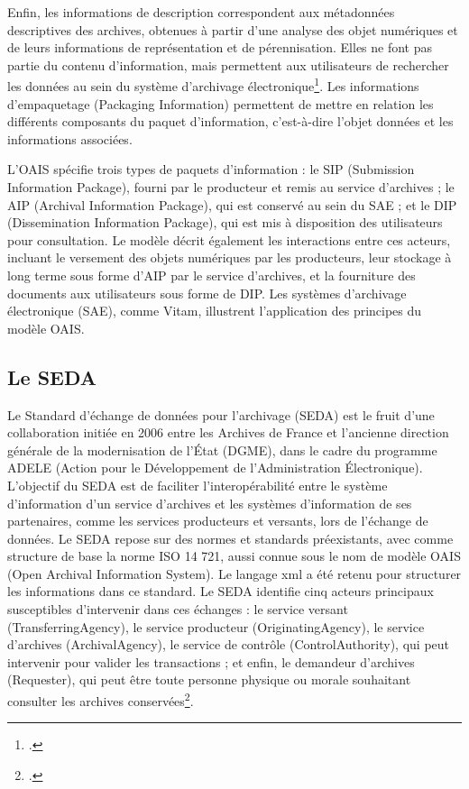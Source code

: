 Enfin, les informations de description correspondent aux métadonnées descriptives des archives, obtenues à partir d'une analyse des objet numériques et de leurs informations de représentation et de pérennisation. Elles ne font pas partie du contenu d'information, mais permettent aux utilisateurs de rechercher les données au sein du système d'archivage électronique\footcite[p.172]{rietschDematerialisationArchivageElectronique2006}. Les informations d’empaquetage  (Packaging  Information) permettent de mettre  en  relation  les  différents composants du paquet d'information, c'est-à-dire l'objet données et les informations associées.

L’OAIS spécifie trois types de paquets d'information : le SIP (Submission Information Package), fourni par le producteur et remis au service d'archives ; le AIP (Archival Information Package), qui est conservé au sein du SAE ; et le DIP (Dissemination Information Package), qui est mis à disposition des utilisateurs pour consultation. Le modèle décrit également les interactions entre ces acteurs, incluant le versement des objets numériques par les producteurs, leur stockage à long terme sous forme d’AIP par le service d'archives, et la fourniture des documents aux utilisateurs sous forme de DIP. Les systèmes d'archivage électronique (SAE), comme Vitam, illustrent l'application des principes du modèle OAIS. 

\subsection*{Le SEDA}
Le Standard d'échange de données pour l'archivage (SEDA) est le fruit d'une collaboration initiée en 2006 entre les Archives de France et l'ancienne direction générale de la modernisation de l'État (DGME), dans le cadre du programme ADELE (Action pour le Développement de l'Administration Électronique). L'objectif du SEDA est de faciliter l'interopérabilité entre le système d'information d'un service d'archives et les systèmes d'information de ses partenaires, comme les services producteurs et versants, lors de l'échange de données. Le SEDA repose sur des normes et standards préexistants, avec comme structure de base la norme ISO 14 721, aussi connue sous le nom de modèle OAIS (Open Archival Information System). Le langage \gls{xml} a été retenu pour structurer les informations dans ce standard. Le SEDA identifie cinq acteurs principaux susceptibles d'intervenir dans ces échanges : le service versant (TransferringAgency), le service producteur (OriginatingAgency), le service d'archives (ArchivalAgency), le service de contrôle (ControlAuthority), qui peut intervenir pour valider les transactions ; et enfin, le demandeur d'archives (Requester), qui peut être toute personne physique ou morale souhaitant consulter les archives conservées\footcite{sibilleStandardEchangeDonnees2015}.

